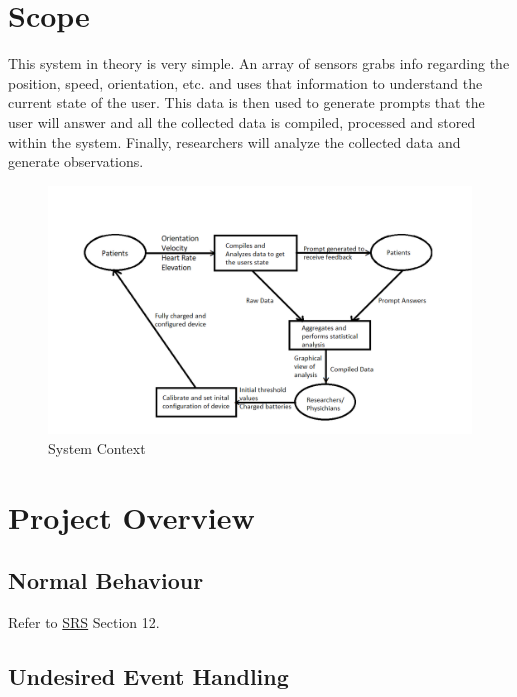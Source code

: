 \documentclass[12pt, titlepage]{article}
\begin{document}
\section{Scope}

This system in theory is very simple. An array of sensors grabs info regarding the position, speed, orientation, etc. and uses that information to understand the current state of the user. This data is then used to generate prompts that the user will answer and all the collected data is compiled, processed and stored within the system. Finally, researchers will analyze the collected data and generate observations. \\

\begin{figure}[H]

\begin{center}
 \includegraphics[width=.95\textwidth]{System Context Diagram}
\caption{System Context}
\label{Fig_SystemContext} 
\end{center}
\end{figure}

\section{Project Overview}

\subsection{Normal Behaviour}

Refer to \href{https://github.com/zakerl/Capstone_Project/blob/main/docs/SRS/SRS.pdf}{SRS} Section 12.

\subsection{Undesired Event Handling}
\end{document}
